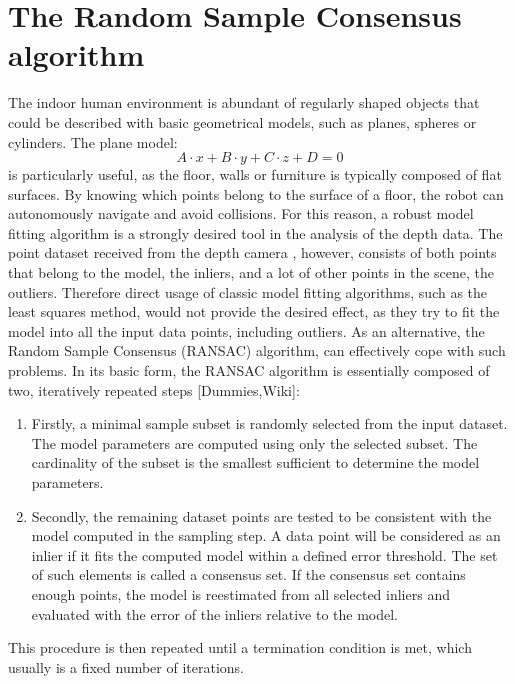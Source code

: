 
\section{The Random Sample Consensus algorithm}
\label{sec:ransac}
The indoor human environment is abundant of regularly shaped objects that could be described with basic geometrical models, such as planes, spheres or cylinders. The plane model:
\begin{equation}
A \cdot x+ B \cdot y+ C \cdot z+ D= 0
\label{eq:planemodel}
\end{equation}
is particularly useful, as the floor, walls or furniture is typically composed of flat surfaces. By knowing which points belong to the surface of a floor, the robot can autonomously navigate and avoid collisions. For this reason, a robust model fitting algorithm is a strongly desired tool in the analysis of the depth data. The point dataset received from the depth camera , however, consists of both points that belong to the model, the inliers, and a lot of other points in the scene, the outliers. Therefore direct usage of classic model fitting algorithms, such as the least squares method, would not provide the desired effect, as they try to fit the model into all the input data points, including outliers. As an alternative, the Random Sample Consensus (RANSAC) algorithm, can effectively cope with such problems. In its basic form, the RANSAC algorithm is essentially composed of two, iteratively repeated steps [Dummies,Wiki]:
\begin{enumerate}
\item Firstly, a minimal sample subset is randomly selected from the input dataset. The model parameters are computed using only the selected subset. The cardinality of the subset is the smallest sufficient to determine the model parameters.
\item Secondly, the remaining dataset points are tested to be consistent with the model computed in the sampling step. A data point will be considered as an inlier if it fits the computed model within a defined error threshold. The set of such elements is called a consensus set. If the consensus set contains enough points, the model is reestimated from all selected inliers and evaluated with the error of the inliers relative to the model.
\end{enumerate}
This procedure is then repeated until a termination condition is met, which usually is a fixed number of iterations.
